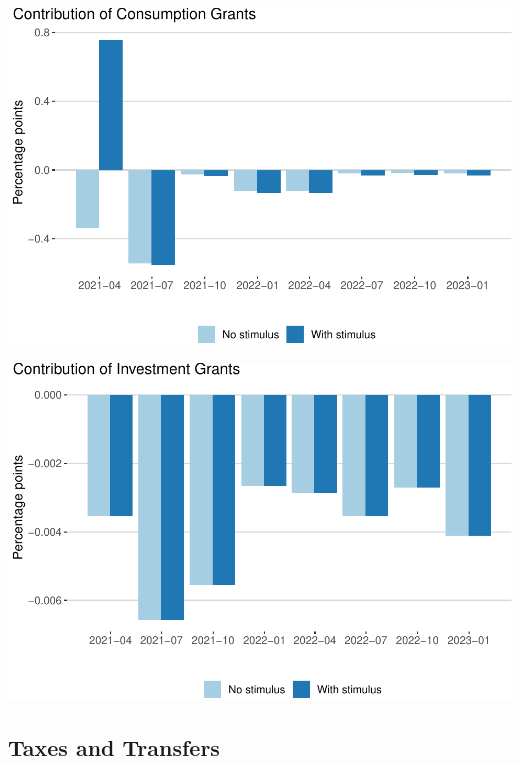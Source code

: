 \documentclass[
]{article}
\begin{document}
\begin{center}\includegraphics{stimulus-changes_files/figure-latex/cgrants-1} \end{center}

\begin{center}\includegraphics{stimulus-changes_files/figure-latex/igrants-1} \end{center}

\hypertarget{taxes-and-transfers}{%
\subsection{Taxes and Transfers}\label{taxes-and-transfers}}
\end{document}
